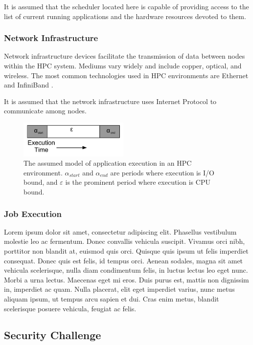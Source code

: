 \documentclass{llncs}
\begin{document}
It is assumed that the scheduler located here is capable of providing access to the list of current running applications and the hardware resources devoted to them. 
\subsubsection{Network Infrastructure}
Network infrastructure devices facilitate the transmission of data between nodes within the HPC system. Mediums vary widely and include copper, optical, and wireless. The most common technologies used in HPC environments are Ethernet and InfiniBand \cite{bozzo2006design}\cite{madai2010performance}. 

It is assumed that the network infrastructure uses Internet Protocol to communicate among nodes.

\begin{figure}
  \begin{center}
    \includegraphics[width=0.48\textwidth]{application_model.pdf}
  \end{center}
  \caption{The assumed model of application execution in an HPC environment. $\alpha_{start}$ and $\alpha_{end}$ are periods where execution is I/O bound, and $\varepsilon$ is the prominent period where execution is CPU bound.}
\label{fig:inline_media_encryptor}
\end{figure}

\subsubsection{Job Execution}
Lorem ipsum dolor sit amet, consectetur adipiscing elit. Phasellus vestibulum molestie leo ac fermentum. Donec convallis vehicula suscipit. Vivamus orci nibh, porttitor non blandit at, euismod quis orci. Quisque quis ipsum ut felis imperdiet consequat. Donec quis est felis, id tempus orci. Aenean sodales, magna sit amet vehicula scelerisque, nulla diam condimentum felis, in luctus lectus leo eget nunc. Morbi a urna lectus. Maecenas eget mi eros. Duis purus est, mattis non dignissim in, imperdiet ac quam. Nulla placerat, elit eget imperdiet varius, nunc metus aliquam ipsum, ut tempus arcu sapien et dui. Cras enim metus, blandit scelerisque posuere vehicula, feugiat ac felis.
\subsection{Security Challenge}
\end{document}

